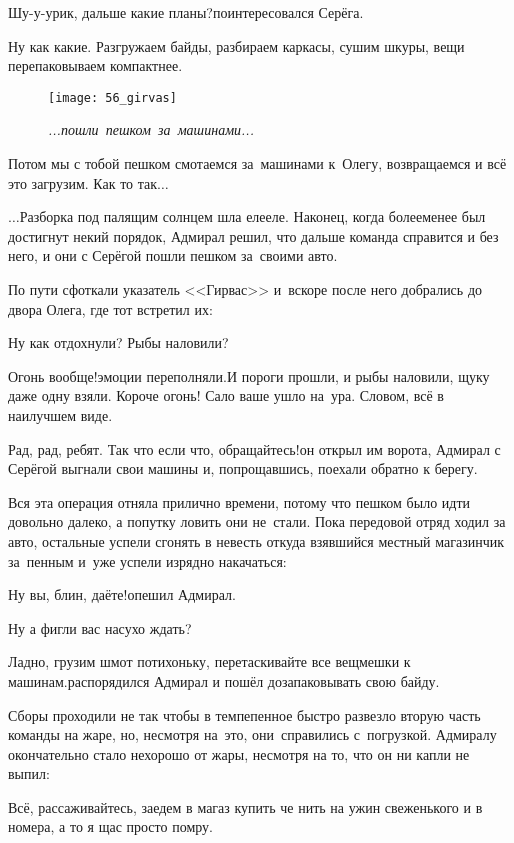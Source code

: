 \diagdash Шу-у-урик, дальше какие планы?\mdash поинтересовался Серёга.

\diagdash Ну как какие. Разгружаем байды, разбираем каркасы, сушим шкуры, вещи перепаковываем компактнее. \begin{wrapfigure}[18]{l}{0.5\textwidth}
	\centering
	\texttt{[image: 56\_girvas]}
	\caption{\small\textit{...пошли~пешком~за~машинами...}}
\end{wrapfigure} Потом мы с тобой пешком смотаемся за~машинами к~Олегу, возвращаемся и всё это загрузим. Как то так$\ldots$

$\ldots$Разборка под палящим солнцем шла еле\sdash еле. Наконец, когда более\sdash менее был достигнут некий порядок, Адмирал решил, что дальше команда справится и без него, и они с Серёгой пошли пешком за~своими авто.

По пути сфоткали указатель <<Гирвас>> и~вскоре после него добрались до двора Олега, где тот встретил их:

\diagdash Ну как отдохнули? Рыбы наловили?

\diagdash Огонь вообще!\mdash эмоции переполняли.\mdash И пороги прошли, и рыбы наловили, щуку даже одну взяли. Короче огонь! Сало ваше ушло на~ура. Словом, всё в наилучшем виде.

\diagdash Рад, рад, ребят. Так что если что, обращайтесь!\mdash он открыл им ворота, Адмирал с Серёгой выгнали свои машины и, попрощавшись, поехали обратно к берегу.

Вся эта операция отняла прилично времени, потому что пешком было идти довольно далеко, а попутку ловить они не~стали. Пока передовой отряд ходил за авто, остальные успели сгонять в невесть откуда взявшийся местный магазинчик за~пенным и~уже успели изрядно накачаться:

\diagdash Ну вы, блин, даёте!\mdash опешил Адмирал.

\diagdash Ну а фигли вас насухо ждать?

\diagdash Ладно, грузим шмот потихоньку, перетаскивайте все вещмешки к машинам.\mdash распорядился Адмирал и пошёл дозапаковывать свою байду.

Сборы проходили не так чтобы в темпе\mdash пенное быстро развезло вторую часть команды на жаре, но, несмотря на~это, они~справились с~погрузкой. Адмиралу окончательно стало нехорошо от жары, несмотря на то, что он ни капли не выпил:

\diagdash Всё, рассаживайтесь, заедем в магаз купить че нить на ужин свеженького и в номера, а то я щас просто помру.

